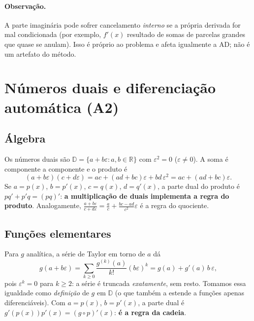 \documentclass[11pt,a4paper]{article}
\begin{document}
\paragraph{Observação.} A parte imaginária pode sofrer cancelamento \emph{interno} se a própria derivada for mal condicionada (por exemplo, $f'(x)$ resultado de somas de parcelas grandes que quase se anulam). Isso é próprio ao problema e afeta igualmente a AD; não é um artefato do método.

\section{Números duais e diferenciação automática (A2)}
\label{sec:dual}

\subsection{Álgebra}
Os números duais são $\mathbb{D}=\{a+b\varepsilon : a,b\in\mathbb{R}\}$ com $\varepsilon^2=0$ ($\varepsilon\neq0$). A soma é componente a componente e o produto é
\begin{equation}
(a+b\varepsilon)(c+d\varepsilon) = ac + (ad+bc)\varepsilon + bd\,\varepsilon^2 = ac + (ad+bc)\varepsilon .
\end{equation}
Se $a=p(x)$, $b=p'(x)$, $c=q(x)$, $d=q'(x)$, a parte dual do produto é $pq'+p'q=(pq)'$: \textbf{a multiplicação de duais implementa a regra do produto}. Analogamente, $\frac{a+b\varepsilon}{c+d\varepsilon} = \frac ac + \frac{bc-ad}{c^2}\varepsilon$ é a regra do quociente.

\subsection{Funções elementares}
Para $g$ analítica, a série de Taylor em torno de $a$ dá
\begin{equation}
g(a+b\varepsilon) = \sum_{k\ge0}\frac{g^{(k)}(a)}{k!}(b\varepsilon)^k = g(a) + g'(a)\,b\,\varepsilon ,
\end{equation}
pois $\varepsilon^k=0$ para $k\ge2$: a série é truncada \emph{exatamente}, sem resto. Tomamos essa igualdade como \emph{definição} de $g$ em $\mathbb{D}$ (o que também a estende a funções apenas diferenciáveis). Com $a=p(x)$, $b=p'(x)$, a parte dual é $g'(p(x))p'(x) = (g\circ p)'(x)$: \textbf{é a regra da cadeia}.
\end{document}
